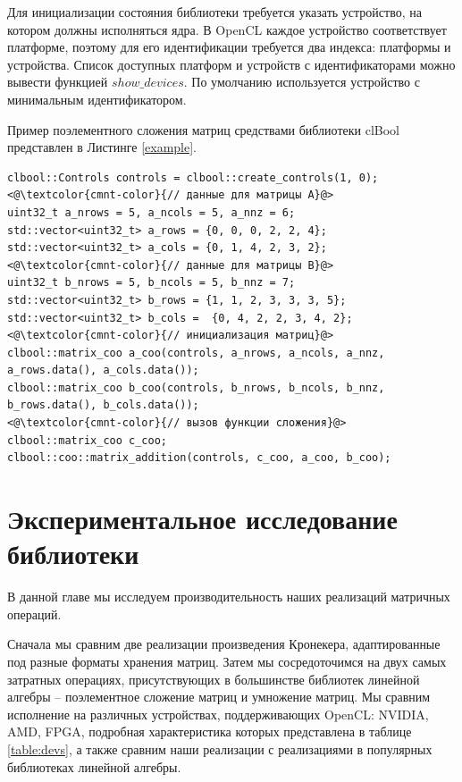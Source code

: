 \documentclass[14pt]{extarticle}
\newcommand{\sectionbreak}{\clearpage}
\begin{document}
	Для инициализации состояния библиотеки требуется указать устройство, на котором должны исполняться ядра. В OpenCL каждое устройство соответствует платформе, поэтому для его идентификации требуется два индекса: платформы и устройства. Список доступных платформ и устройств с идентификаторами можно вывести функцией $show\_devices$. По умолчанию используется устройство с минимальным идентификатором. 
	
	Пример поэлементного сложения матриц средствами библиотеки clBool представлен в Листинге \ref{example}.
	
\begin{minipage}{\linewidth}%
	\small
	\begin{lstlisting}[breaklines=true,caption={Инициализация состояния и вызов функции сложения}, label={example}, style = mystyle]
clbool::Controls controls = clbool::create_controls(1, 0);
<@\textcolor{cmnt-color}{// данные для матрицы A}@>
uint32_t a_nrows = 5, a_ncols = 5, a_nnz = 6;
std::vector<uint32_t> a_rows = {0, 0, 0, 2, 2, 4};
std::vector<uint32_t> a_cols = {0, 1, 4, 2, 3, 2};
<@\textcolor{cmnt-color}{// данные для матрицы B}@>
uint32_t b_nrows = 5, b_ncols = 5, b_nnz = 7;
std::vector<uint32_t> b_rows = {1, 1, 2, 3, 3, 3, 5};
std::vector<uint32_t> b_cols =  {0, 4, 2, 2, 3, 4, 2};
<@\textcolor{cmnt-color}{// инициализация матриц}@>
clbool::matrix_coo a_coo(controls, a_nrows, a_ncols, a_nnz, a_rows.data(), a_cols.data());
clbool::matrix_coo b_coo(controls, b_nrows, b_ncols, b_nnz, b_rows.data(), b_cols.data());
<@\textcolor{cmnt-color}{// вызов функции сложения}@>
clbool::matrix_coo c_coo;
clbool::coo::matrix_addition(controls, c_coo, a_coo, b_coo);
\end{lstlisting}
\end{minipage}
	
	
\sectionbreak

\section{Экспериментальное исследование библиотеки}\label{experiments}
	
	В данной главе мы исследуем производительность наших реализаций матричных операций. 
	
	Сначала мы сравним две реализации произведения Кронекера, адаптированные под разные форматы хранения матриц. Затем мы сосредоточимся на двух самых затратных операциях, присутствующих в большинстве библиотек линейной алгебры -- поэлементное сложение матриц и умножение матриц. Мы сравним исполнение на различных устройствах, поддерживающих OpenCL: NVIDIA, AMD, FPGA, подробная характеристика которых представлена в таблице \ref{table:devs}, а также  сравним наши реализации с реализациями в популярных библиотеках линейной алгебры.
	
\end{document}
